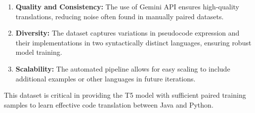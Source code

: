 \documentclass{dhbenelux}
\begin{document}
\begin{enumerate}
  \item \textbf{Quality and Consistency:} The use of Gemini API ensures high-quality translations, reducing noise often found in manually paired datasets.
  \item \textbf{Diversity:} The dataset captures variations in pseudocode expression and their implementations in two syntactically distinct languages, ensuring robust model training.
  \item \textbf{Scalability:} The automated pipeline allows for easy scaling to include additional examples or other languages in future iterations.
\end{enumerate}

This dataset is critical in providing the T5 model with sufficient paired training samples to learn effective code translation between Java and Python.
\end{document}
